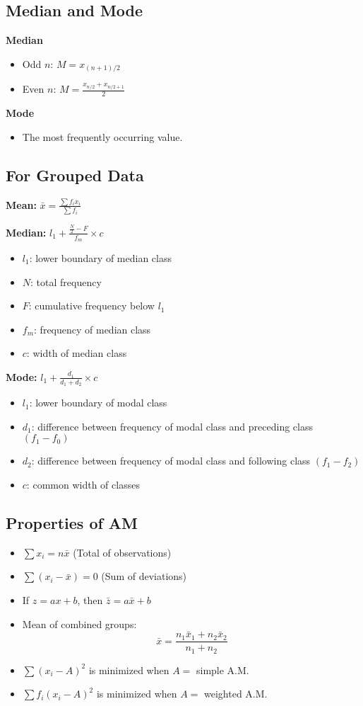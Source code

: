 \subsection*{Median and Mode}
\textbf{Median}
\begin{itemize}
    \item Odd $n$: $ M = x_{(n+1)/2} $
    \item Even $n$: $ M = \frac{x_{n/2} + x_{n/2+1}}{2} $
\end{itemize}

\textbf{Mode}
\begin{itemize}
    \item The most frequently occurring value.
\end{itemize}

\subsection*{For Grouped Data}
\textbf{Mean:} $ \bar{x} = \frac{\sum f_i x_i}{\sum f_i} $

\textbf{Median:} $ l_1 + \frac{\frac{N}{2} - F}{f_m} \times c $
\begin{itemize}
    \item $l_1$: lower boundary of median class
    \item $N$: total frequency
    \item $F$: cumulative frequency below $l_1$
    \item $f_m$: frequency of median class
    \item $c$: width of median class
\end{itemize}

\textbf{Mode:} $ l_1 + \frac{d_1}{d_1 + d_2} \times c $
\begin{itemize}
    \item $l_1$: lower boundary of modal class
    \item $d_1$: difference between frequency of modal class and preceding class $(f_1 - f_0)$
    \item $d_2$: difference between frequency of modal class and following class $(f_1 - f_2)$
    \item $c$: common width of classes
\end{itemize}

\subsection*{Properties of AM}
\begin{itemize}
    \item $ \sum x_i = n \bar{x} $ (Total of observations)
    \item $ \sum (x_i - \bar{x}) = 0 $ (Sum of deviations)
    \item If $ z = ax + b $, then $ \bar{z} = a \bar{x} + b $
    \item Mean of combined groups:
    \[ \bar{x} = \frac{n_1 \bar{x}_1 + n_2 \bar{x}_2}{n_1 + n_2} \]
    \item $ \sum (x_i - A)^2 $ is minimized when $ A = $ simple A.M.
    \item $ \sum f_i(x_i - A)^2 $ is minimized when $ A = $ weighted A.M.
\end{itemize}

